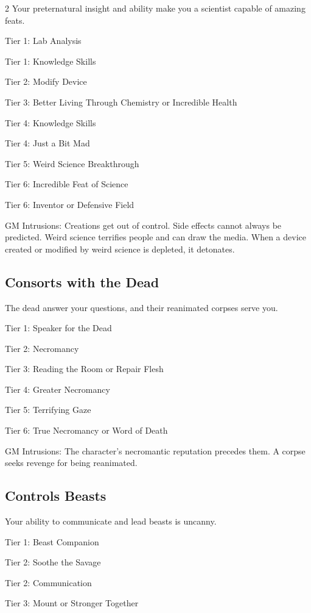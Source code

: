 \begin{multicols}{2}
Your preternatural insight and ability make you a scientist capable of amazing feats.

Tier 1: Lab Analysis

Tier 1: Knowledge Skills

Tier 2: Modify Device

Tier 3: Better Living Through Chemistry or Incredible Health

Tier 4: Knowledge Skills

Tier 4: Just a Bit Mad

Tier 5: Weird Science Breakthrough

Tier 6: Incredible Feat of Science

Tier 6: Inventor or Defensive Field

GM Intrusions: Creations get out of control. Side effects cannot always be predicted. Weird science terrifies people and can draw the media. When a device created or modified by weird science is depleted, it detonates.

\subsection{Consorts with the Dead}

The dead answer your questions, and their reanimated corpses serve you.

Tier 1: Speaker for the Dead

Tier 2: Necromancy

Tier 3: Reading the Room or Repair Flesh

Tier 4: Greater Necromancy

Tier 5: Terrifying Gaze

Tier 6: True Necromancy or Word of Death

GM Intrusions: The character’s necromantic reputation precedes them. A corpse seeks revenge for being reanimated.

\subsection{Controls Beasts}

Your ability to communicate and lead beasts is uncanny.

Tier 1: Beast Companion

Tier 2: Soothe the Savage

Tier 2: Communication

Tier 3: Mount or Stronger Together


\end{multicols}
